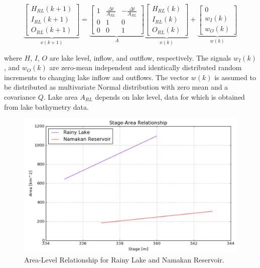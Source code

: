 \documentclass[preprint,times]{elsarticle}
\begin{document}
{\tiny
$$\underbrace{\left[\begin{array}{c} H_{RL}(k+1) \\ I_{RL}(k+1) \\ O_{RL}(k+1) \end{array}\right]}_{x(k+1)} = \underbrace{\left[ \begin{array}{ccc} 1 & \frac{\Delta t}{A_{RL}} & -\frac{\Delta t}{A_{RL}} \\0 & 1 & 0\\0 & 0 &  1\end{array}\right]}_{A} \underbrace{\left[\begin{array}{c} H_{RL}(k) \\ I_{RL}(k) \\ O_{RL}(k) \end{array}\right]}_{x(k)} + \underbrace{\left[ \begin{array}{c} 0 \\ w_{I}(k) \\ w_{O}(k)\end{array}\right]}_{w(k)}$$
}

\noindent
where $H$, $I$, $O$ are lake level, inflow, and outflow, respectively. The signals $w_I(k)$, and $w_O(k)$ are zero-mean independent and identically distributed random increments to changing lake inflow and outflows. The vector $w(k)$ is assumed to be distributed as multivariate Normal distribution with zero mean and a covariance $Q$. Lake area $A_{RL}$ depends on lake level, data for which is obtained from lake bathymetry data.

\begin{figure}
\includegraphics[width=\linewidth]{StageArea}
\caption{Area-Level Relationship for Rainy Lake and Namakan Reservoir.}\label{figure:6}
\end{figure}
\end{document}
